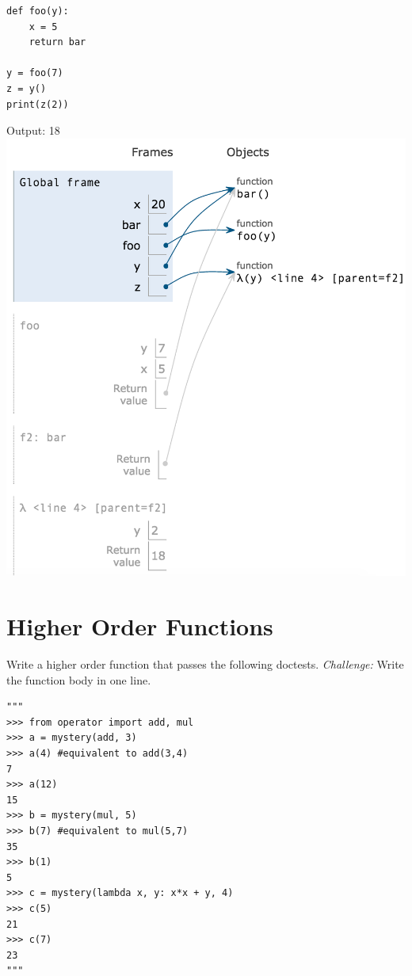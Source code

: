 \documentclass{exam}
\begin{document}
\begin{questions}
\begin{blocksection}
\begin{lstlisting}
def foo(y):
    x = 5
    return bar

y = foo(7)
z = y()
print(z(2))
\end{lstlisting}

\begin{solution}[0.3in]
   Output: 18 \newline
    \includegraphics[scale=0.5]{img/foobar2.png}
\end{solution}
\end{blocksection}

\section{Higher Order Functions}

\begin{blocksection}
\question Write a higher order function that passes the following doctests.
\emph{Challenge:} Write the function body in one line.

\begin{lstlisting}
"""
>>> from operator import add, mul
>>> a = mystery(add, 3)
>>> a(4) #equivalent to add(3,4)
7
>>> a(12)
15
>>> b = mystery(mul, 5)
>>> b(7) #equivalent to mul(5,7)
35
>>> b(1)
5
>>> c = mystery(lambda x, y: x*x + y, 4)
>>> c(5)
21
>>> c(7)
23
"""
\end{lstlisting}


\end{blocksection}
\end{questions}
\end{document}

